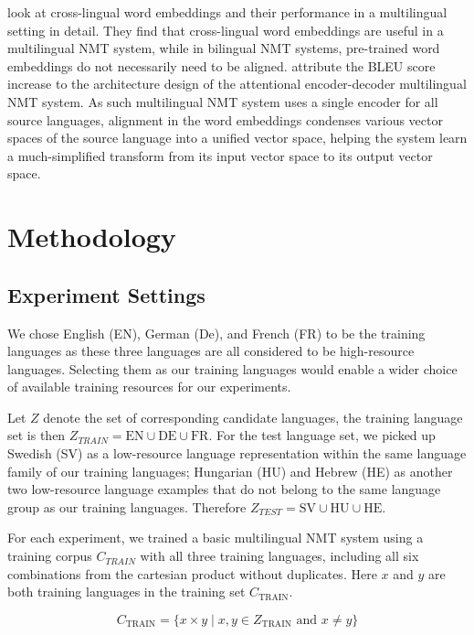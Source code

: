 \documentclass[thesis,fonts=libertine]{cluu}
\begin{document}
\textcite{Qi:2018aa} look at cross-lingual word embeddings and their performance in a multilingual setting in detail. They find that cross-lingual word embeddings are useful in a multilingual NMT system, while in bilingual NMT systems, pre-trained word embeddings do not necessarily need to be aligned. \textcite{Qi:2018aa} attribute the BLEU score increase to the architecture design of the attentional encoder-decoder multilingual NMT system. As such multilingual NMT system uses a single encoder for all source languages, alignment in the word embeddings condenses various vector spaces of the source language into a unified vector space, helping the system learn a much-simplified transform from its input vector space to its output vector space.

\chapter{Methodology}
\label{chap:method}

\section{Experiment Settings}
\label{sec:initial_exp_settings}

We chose English (EN), German (De), and French (FR) to be the training languages as these three languages are all considered to be high-resource languages. Selecting them as our training languages would enable a wider choice of available training resources for our experiments.

Let $Z$ denote the set of corresponding candidate languages, the training language set is then $Z_{TRAIN} = {\text{EN}\cup \text{DE}\cup \text{FR}}$. For the test language set, we picked up Swedish (SV) as a low-resource language representation within the same language family of our training languages; Hungarian (HU) and Hebrew (HE) as another two low-resource language examples that do not belong to the same language group as our training languages. Therefore $Z_{TEST} = {\text{SV}\cup \text{HU}\cup \text{HE}}$.

For each experiment, we trained a basic multilingual NMT system using a training corpus $C_{TRAIN}$ with all three training languages, including all six combinations from the cartesian product without duplicates. Here $x$ and $y$ are both training languages in the training set $C_{\text{TRAIN}}$.

\begin{equation*}
  C_{\text{TRAIN}} = \{x \times y \mid x, y \in Z_{\text{TRAIN}} \text{ and } x \neq y\}
\end{equation*}
\end{document}
